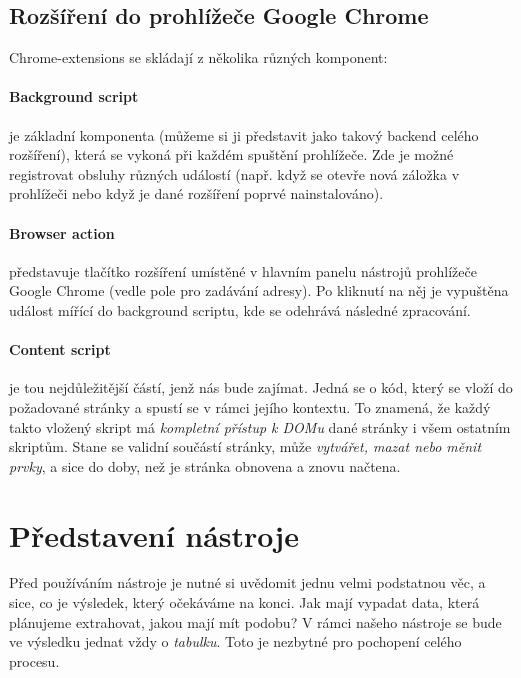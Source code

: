 \documentclass[thesis=B,czech]{FITthesis2}[2012/06/26]
\begin{document}
	\subsection{Rozšíření do prohlížeče Google Chrome}
	Chrome-extensions se skládají z několika různých komponent:
	\paragraph{Background script} je základní komponenta (můžeme si ji představit jako takový backend celého rozšíření), která se vykoná při každém spuštění prohlížeče. Zde je možné registrovat obsluhy různých událostí (např. když se otevře nová záložka v prohlížeči nebo když je dané rozšíření poprvé nainstalováno). 
	\paragraph{Browser action} představuje tlačítko rozšíření umístěné v hlavním panelu nástrojů prohlížeče Google Chrome (vedle pole pro zadávání adresy). Po kliknutí na něj je vypuštěna událost mířící do background scriptu, kde se odehrává následné zpracování.
	\paragraph{Content script} je tou nejdůležitější částí, jenž nás bude zajímat. Jedná se o kód, který se vloží do požadované stránky a spustí se v rámci jejího kontextu. To znamená, že každý takto vložený skript má \emph{kompletní přístup k DOMu} dané stránky i všem ostatním skriptům. Stane se validní součástí stránky, může \emph{vytvářet, mazat nebo měnit prvky}, a sice do doby, než je stránka obnovena a znovu načtena.
	
	\section{Představení nástroje}
	Před používáním nástroje je nutné si uvědomit jednu velmi podstatnou věc, a sice, co je výsledek, který očekáváme na konci. Jak mají vypadat data, která plánujeme extrahovat, jakou mají mít podobu? V rámci našeho nástroje se bude ve výsledku jednat vždy o \emph{tabulku}. Toto je nezbytné pro pochopení celého procesu.
	
\end{document}

